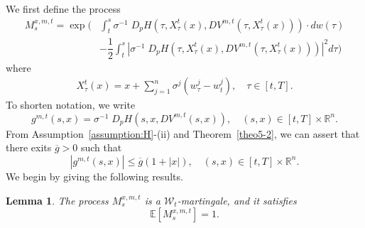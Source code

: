 \documentclass[11pt]{article}
\numberwithin{equation}{section}
\newtheorem{lemma}[theorem]{Lemma}
\newcommand{\e}{\mathbb{E}}
\newcommand{\brn}{{\mathbb{R}^n}}
\newcommand{\1}{\mbox{1\hspace{-1mm}I}}
\begin{document}
We first define the process 
\begin{equation*}\label{eq:5-61}
\begin{aligned}
    M^{x,m,t}_s=\exp\bigg(&\int_{t}^{s}\sigma^{-1}\; D_p H\left(\tau, X^{t}_\tau(x),DV^{m,t}\left(\tau, X^{t}_\tau(x) \right)\right)\cdot dw(\tau)\\
    &-\dfrac{1}{2}\int_{t}^{s}\left|\sigma^{-1}\;D_p H\left(\tau,X^{t}_\tau(x),DV^{m,t}\left(\tau, X^{t}_\tau(x) \right)\right)\right|^{2}d\tau\bigg)
\end{aligned}
\end{equation*}
where 
\begin{align}\label{def:SDE}
    X^{t}_\tau(x)=x+\sum_{j=1}^n \sigma^{j}\left(w^{j}_\tau-w^{j}_t\right),\quad \tau\in[t,T].
\end{align}
To shorten notation, we write 
\begin{equation*}\label{eq:5-62}
    g^{m,t}(s,x)=\sigma^{-1}\;D_p H\left(s,x,DV^{m,t}(s,x)\right),\quad (s,x)\in[t,T]\times\brn. 
\end{equation*}
From Assumption~\ref{assumption:H}-(ii) and Theorem~\ref{theo5-2}, we can assert that there exits $\overline{g}>0$ such that
\begin{equation}\label{eq:5-63}
    \left|g^{m,t}(s,x)\right|\leq\overline{g}(1+|x|),\quad (s,x)\in[t,T]\times\brn.
\end{equation}
We begin by giving the following results.

\begin{lemma}
\label{lem5-1}The process $M^{x,m,t}_s$ is a $\mathcal{W}_{t}$-martingale, and it satisfies
\begin{equation}\label{eq:5-64}
    \e \left[M^{x,m,t}_s\right]=1. 
\end{equation}
\end{lemma}
\end{document}
